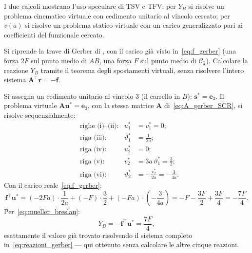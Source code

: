 \begin{esempio}
\begin{svolgimento}
		\begin{oss}
			I due calcoli mostrano l'uso speculare di TSV e TFV:
			per $Y_B$ si risolve un problema cinematico virtuale
			con cedimento unitario al vincolo cercato; per $v(a)$
			si risolve un problema statico virtuale con un carico
			generalizzato pari ai coefficienti del funzionale
			cercato.
		\end{oss}
		
	\end{svolgimento}
\end{esempio}


\begin{esempio}
	\label{ex:gerber_TSV}
	Si riprende la trave di Gerber di ,
	con il carico già visto in~\eqref{eq:f_gerber} (una forza
	$2F$ sul punto medio di $AB$, una forza $F$ sul punto medio
	di $\mathcal{C}_2$). Calcolare la reazione $Y_B$ tramite il
	teorema degli spostamenti virtuali, senza risolvere
	l'intero sistema $\bm A^\top\bm r=-\bm f$.
	
	\begin{svolgimento}
		
		Si assegna un cedimento unitario al vincolo 3 (il
		carrello in $B$): $\bm s^*=\bm e_3$. Il problema
		virtuale $\bm A\bm u^*=\bm e_3$, con la stessa matrice
		$\bm A$ di~\eqref{eq:A_gerber_SCR}, si risolve
		sequenzialmente:
		\begin{align*}
			&\text{righe (i)--(ii):}& u_1^*&=v_1^*=0;\\
			&\text{riga (iii):}& \vartheta_1^*&=\frac{1}{2a};\\
			&\text{riga (iv):}& u_2^*&=0;\\
			&\text{riga (v):}& v_2^*&=3a\,\vartheta_1^*=\frac{3}{2};\\
			&\text{riga (vi):}& \vartheta_2^*&=
			-\frac{v_2^*}{2a}=-\frac{3}{4a}.
		\end{align*}
		Con il carico reale~\eqref{eq:f_gerber}:
		\begin{equation*}
			\bm f^\top\bm u^* =
			(-2Fa)\cdot\frac{1}{2a} + (-F)\cdot\frac{3}{2}
			+ (-Fa)\cdot\left(-\frac{3}{4a}\right)
			= -F - \frac{3F}{2} + \frac{3F}{4}
			= -\frac{7F}{4}.
		\end{equation*}
		Per~\eqref{eq:mueller_breslau}:
		\begin{equation*}
			Y_B = -\bm f^\top\bm u^* = \frac{7F}{4},
		\end{equation*}
		esattamente il valore già trovato risolvendo il sistema
		completo in~\eqref{eq:reazioni_gerber} --- qui ottenuto
		senza calcolare le altre cinque reazioni.
		
	\end{svolgimento}
\end{esempio}

